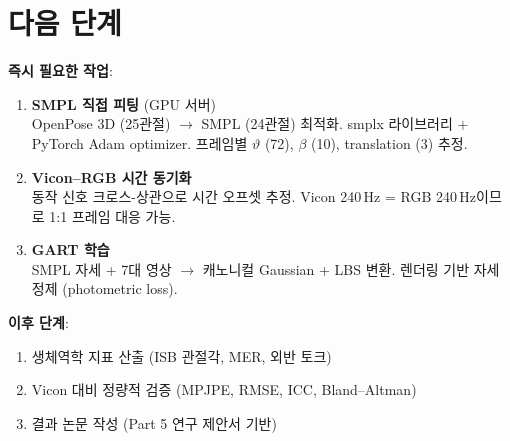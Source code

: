 \documentclass[11pt, a4paper]{report}
\begin{document}
\chapter{다음 단계}

\begin{nextbox}
\textbf{즉시 필요한 작업}:

\begin{enumerate}[leftmargin=*]
  \item \textbf{SMPL 직접 피팅} (GPU 서버)\\
    OpenPose 3D (25관절) $\rightarrow$ SMPL (24관절) 최적화.
    smplx 라이브러리 + PyTorch Adam optimizer.
    프레임별 $\vartheta$ (72), $\beta$ (10), translation (3) 추정.

  \item \textbf{Vicon--RGB 시간 동기화}\\
    동작 신호 크로스-상관으로 시간 오프셋 추정.
    Vicon 240\,Hz = RGB 240\,Hz이므로 1:1 프레임 대응 가능.

  \item \textbf{GART 학습}\\
    SMPL 자세 + 7대 영상 $\rightarrow$ 캐노니컬 Gaussian + LBS 변환.
    렌더링 기반 자세 정제 (photometric loss).
\end{enumerate}
\end{nextbox}

\begin{nextbox}
\textbf{이후 단계}:
\begin{enumerate}[leftmargin=*, start=4]
  \item 생체역학 지표 산출 (ISB 관절각, MER, 외반 토크)
  \item Vicon 대비 정량적 검증 (MPJPE, RMSE, ICC, Bland--Altman)
  \item 결과 논문 작성 (Part 5 연구 제안서 기반)
\end{enumerate}
\end{nextbox}
\end{document}
